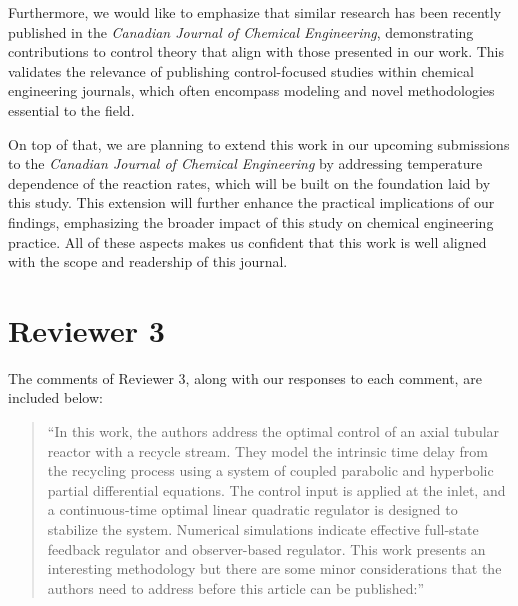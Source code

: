 \documentclass[11pt,answers]{exam}
\begin{document}
\begin{questions}
\begin{solutionorbox}
        Furthermore, we would like to emphasize that similar research \cite{li2024novel, azhin2021modelling} has been recently published in the \textit{Canadian Journal of Chemical Engineering}, demonstrating contributions to control theory that align with those presented in our work. This validates the relevance of publishing control-focused studies within chemical engineering journals, which often encompass modeling and novel methodologies essential to the field.

        On top of that, we are planning to extend this work in our upcoming submissions to the \textit{Canadian Journal of Chemical Engineering} by addressing temperature dependence of the reaction rates, which will be built on the foundation laid by this study. This extension will further enhance the practical implications of our findings, emphasizing the broader impact of this study on chemical engineering practice. All of these aspects makes us confident that this work is well aligned with the scope and readership of this journal.
    \end{solutionorbox}

\end{questions}

\newpage
\section*{Reviewer 3}

The comments of Reviewer 3, along with our responses to each comment, are included below:

\begin{quote}
    ``In this work, the authors address the optimal control of an axial tubular reactor with a recycle stream. They model the intrinsic time delay from the recycling process using a system of coupled parabolic and hyperbolic partial differential equations. The control input is applied at the inlet, and a continuous-time optimal linear quadratic regulator is designed to stabilize the system. Numerical simulations indicate effective full-state feedback regulator and observer-based regulator. This work presents an interesting methodology but there are some minor considerations that the authors need to address before this article can be published:''
\end{quote}
\end{document}

